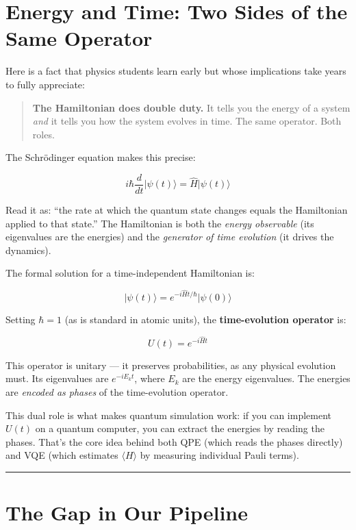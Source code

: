 \documentclass[
  11pt,
  oneside]{book}
\begin{document}
\section{Energy and Time: Two Sides of the Same
Operator}\label{energy-and-time-two-sides-of-the-same-operator}

Here is a fact that physics students learn early but whose implications
take years to fully appreciate:

\begin{quote}
\textbf{The Hamiltonian does double duty.} It tells you the energy of a
system \emph{and} it tells you how the system evolves in time. The same
operator. Both roles.
\end{quote}

The Schrödinger equation makes this precise:

\[i\hbar \frac{d}{dt}\lvert\psi(t)\rangle = \hat{H}\lvert\psi(t)\rangle\]

Read it as: ``the rate at which the quantum state changes equals the
Hamiltonian applied to that state.'' The Hamiltonian is both the
\emph{energy observable} (its eigenvalues are the energies) and the
\emph{generator of time evolution} (it drives the dynamics).

The formal solution for a time-independent Hamiltonian is:

\[\lvert\psi(t)\rangle = e^{-i\hat{H}t/\hbar}\lvert\psi(0)\rangle\]

Setting \(\hbar = 1\) (as is standard in atomic units), the
\textbf{time-evolution operator} is:

\[U(t) = e^{-i\hat{H}t}\]

This operator is unitary --- it preserves probabilities, as any physical
evolution must. Its eigenvalues are \(e^{-iE_k t}\), where \(E_k\) are
the energy eigenvalues. The energies are \emph{encoded as phases} of the
time-evolution operator.

This dual role is what makes quantum simulation work: if you can
implement \(U(t)\) on a quantum computer, you can extract the energies
by reading the phases. That's the core idea behind both QPE (which reads
the phases directly) and VQE (which estimates \(\langle H \rangle\) by
measuring individual Pauli terms).

\begin{center}\rule{0.5\linewidth}{0.5pt}\end{center}

\section{The Gap in Our Pipeline}\label{the-gap-in-our-pipeline}
\end{document}
